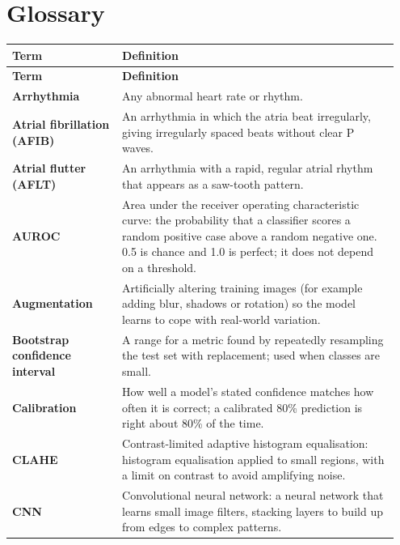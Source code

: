 \documentclass[12pt,nonacm,acmlarge,titlepage,screen]{acmart}
\begin{document}


\newpage
\section*{Glossary}
\label{glossary}

\begingroup
\small
\renewcommand{\arraystretch}{1.5}
\begin{longtable}{@{}>{\raggedright\arraybackslash}P{0.27\linewidth} P{0.68\linewidth}@{}}
  \toprule
  \textbf{Term} & \textbf{Definition} \\
  \midrule
  \endfirsthead
  \toprule
  \textbf{Term} & \textbf{Definition} \\
  \midrule
  \endhead
  \bottomrule
  \endfoot
  \textbf{Arrhythmia} & Any abnormal heart rate or rhythm. \\
  \textbf{Atrial fibrillation (AFIB)} & An arrhythmia in which the atria beat irregularly, giving irregularly spaced beats without clear P waves. \\
  \textbf{Atrial flutter (AFLT)} & An arrhythmia with a rapid, regular atrial rhythm that appears as a saw-tooth pattern. \\
  \textbf{AUROC} & Area under the receiver operating characteristic curve: the probability that a classifier scores a random positive case above a random negative one. 0.5 is chance and 1.0 is perfect; it does not depend on a threshold. \\
  \textbf{Augmentation} & Artificially altering training images (for example adding blur, shadows or rotation) so the model learns to cope with real-world variation. \\
  \textbf{Bootstrap confidence interval} & A range for a metric found by repeatedly resampling the test set with replacement; used when classes are small. \\
  \textbf{Calibration} & How well a model's stated confidence matches how often it is correct; a calibrated 80\% prediction is right about 80\% of the time. \\
  \textbf{CLAHE} & Contrast-limited adaptive histogram equalisation: histogram equalisation applied to small regions, with a limit on contrast to avoid amplifying noise. \\
  \textbf{CNN} & Convolutional neural network: a neural network that learns small image filters, stacking layers to build up from edges to complex patterns. \\

\end{longtable}
\end{document}
